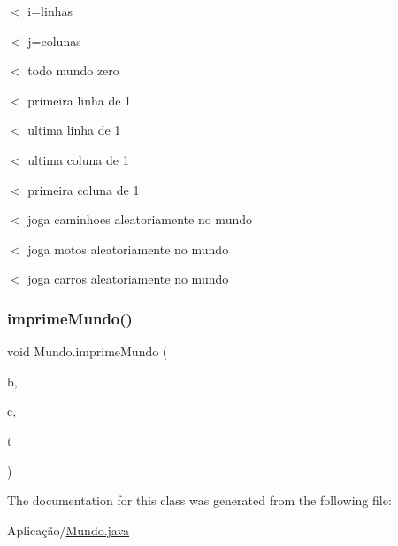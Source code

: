 $<$ i=linhas

$<$ j=colunas

$<$ todo mundo zero

$<$ primeira linha de 1

$<$ ultima linha de 1

$<$ ultima coluna de 1

$<$ primeira coluna de 1

$<$ joga caminhoes aleatoriamente no mundo

$<$ joga motos aleatoriamente no mundo

$<$ joga carros aleatoriamente no mundo \mbox{\label{class_mundo_a063aff787cf37c4f6461c825a5f6be26}} 
\subsubsection{\texorpdfstring{imprime\+Mundo()}{imprimeMundo()}}
{\footnotesize\ttfamily void Mundo.\+imprime\+Mundo (\begin{DoxyParamCaption}\item[{Array\+List$<$ \mbox{\hyperlink{class_moto}{Moto}} $>$}]{b,  }\item[{Array\+List$<$ \mbox{\hyperlink{class_carro}{Carro}} $>$}]{c,  }\item[{Array\+List$<$ \mbox{\hyperlink{class_caminhao}{Caminhao}} $>$}]{t }\end{DoxyParamCaption})}



The documentation for this class was generated from the following file\+:\begin{DoxyCompactItemize}
\item 
Aplicação/\mbox{\hyperlink{_mundo_8java}{Mundo.\+java}}\end{DoxyCompactItemize}
